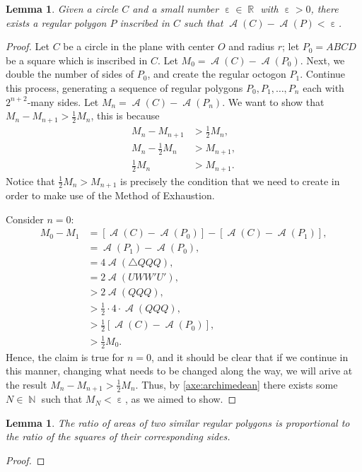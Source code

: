 \documentclass[letterpaper, 12pt]{amsart}
\DeclareMathOperator{\N}{\mathbb{N}}
\DeclareMathOperator{\R}{\mathbb{R}}
\DeclareMathOperator{\A}{\mathcal{A}}
\DeclareMathOperator{\ep}{\varepsilon}
\newtheorem{lemma}[thm]{Lemma}
\theoremstyle{definition}  %
\begin{document}
		\begin{lemma}
		Given a circle $C$ and a small number $\ep \in \R$ with $\ep > 0$, there exists a regular polygon $P$ inscribed in $C$ such that $\A(C) - \A(P) < \ep$.
		\end{lemma}
		\begin{proof}
		Let $C$ be a circle in the plane with center $O$ and radius $r$; let $P_{0} = ABCD$ be a square which is inscribed in $C$.
		Let $M_{0} = \A(C) - \A(P_{0})$.
		Next, we double the number of sides of $P_{0}$, and create the regular octogon $P_{1}$.
		Continue this process, generating a sequence of regular polygons $P_{0}, P_{1}, \dots, P_{n}$ each with $2^{n+2}$-many sides.
		Let $M_{n} = \A(C) - \A(P_{n})$.
		We want to show that $M_{n} - M_{n+1} > \tfrac{1}{2}M_{n}$, this is because 
			\begin{align*}
			M_{n} - M_{n+1} &> \tfrac{1}{2}M_{n}, \\
			M_{n} - \tfrac{1}{2}M_{n} &> M_{n+1}, \\
			\tfrac{1}{2}M_{n} &> M_{n+1}.
			\end{align*}
		Notice that $\tfrac{1}{2}M_{n} > M_{n+1}$ is precisely the condition that we need to create in order to make use of the Method of Exhaustion.

		Consider $n = 0$:
			\begin{align*}
			M_{0} - M_{1} &= [\A(C) - \A(P_{0})] - [\A(C) - \A(P_{1})], \\
			&= \A(P_{1}) - \A(P_{0}), \\
			&= 4 \A(\triangle QQQ), \\
			&= 2 \A(UWW'U'), \\
			&> 2 \A(QQQ), \\
			&> \tfrac{1}{2} \cdot 4 \cdot \A(QQQ), \\
			&> \tfrac{1}{2} \left[ \A(C) - \A(P_{0}) \right], \\
			&> \tfrac{1}{2} M_{0}.
			\end{align*}
		Hence, the claim is true for $n=0$, and it should be clear that if we continue in this manner, changing what needs to be changed along the way, we will arive at the result $M_{n} - M_{n+1} > \tfrac{1}{2}M_{n}$.
		Thus, by \ref{axe:archimedean} there exists some $N \in \N$ such that $M_{N} < \ep$, as we aimed to show.
		\end{proof}

		\begin{lemma}
		The ratio of areas of two similar regular polygons is proportional to the ratio of the squares of their corresponding sides.
		\end{lemma}
		\begin{proof}
		\end{proof}
\end{document}
